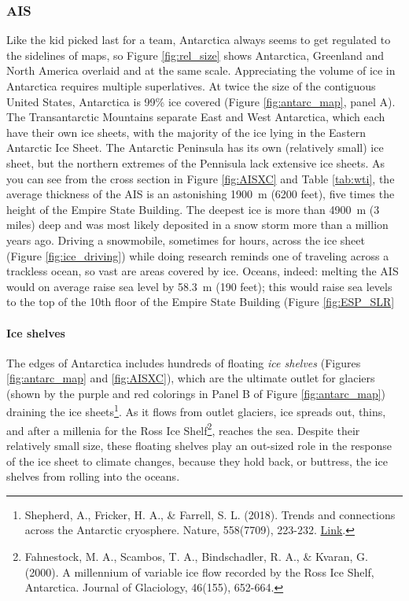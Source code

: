 \subsubsection{AIS}
Like the kid picked last for a team, Antarctica always seems to get regulated to the sidelines of maps, so Figure \ref{fig:rel_size} shows Antarctica, Greenland and North America overlaid and at the same scale. Appreciating the volume of ice in Antarctica requires multiple superlatives. At twice the size of the contiguous United States, Antarctica is 99\% ice covered (Figure \ref{fig:antarc_map}, panel A). The Transantarctic Mountains separate East and West Antarctica, which each have their own ice sheets, with the majority of the ice lying in the Eastern Antarctic Ice Sheet. The Antarctic Peninsula has its own (relatively small) ice sheet, but the northern extremes of the Pennisula lack extensive ice sheets. As you can see from the cross section in Figure \ref{fig:AISXC} and Table \ref{tab:wti}, the average thickness of the AIS is an astonishing \SI{1900}{\metre} (6200 feet), five times the height of the Empire State Building. The deepest ice is more than \SI{4900}{\metre} (3 miles) deep and was most likely deposited in a snow storm more than a million years ago. Driving a snowmobile, sometimes for hours, across the ice sheet (Figure \ref{fig:ice_driving}) while doing research reminds one of traveling across a trackless ocean, so vast are areas covered by ice. Oceans, indeed: melting the AIS would on average raise sea level by \SI{58.3}{\metre} (190 feet); this would raise sea levels to the top of the 10th floor of the Empire State Building (Figure \ref{fig:ESP_SLR}\\
\paragraph{Ice shelves} The edges of Antarctica includes hundreds of floating \emph{ice shelves} (Figures \ref{fig:antarc_map} and \ref{fig:AISXC}), which are the ultimate outlet for glaciers (shown by the purple and red colorings in Panel B of Figure \ref{fig:antarc_map}) draining the ice sheets\footnote{Shepherd, A., Fricker, H. A., \& Farrell, S. L. (2018). Trends and connections across the Antarctic cryosphere. Nature, 558(7709), 223-232. \href{https://doi.org/10.1038/s41586-018-0171-6}{Link}.}. As it flows from outlet glaciers, ice spreads out, thins, and after a millenia for the Ross Ice Shelf\footnote{Fahnestock, M. A., Scambos, T. A., Bindschadler, R. A., \& Kvaran, G. (2000). A millennium of variable ice flow recorded by the Ross Ice Shelf, Antarctica. Journal of Glaciology, 46(155), 652-664.}, reaches the sea. Despite their relatively small size, these floating shelves play an out-sized role in the response of the ice sheet to climate changes, because they hold back, or buttress, the ice shelves from rolling into the oceans.\\

